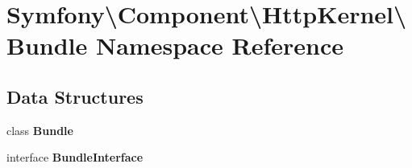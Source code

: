 \section{Symfony\textbackslash{}Component\textbackslash{}Http\+Kernel\textbackslash{}Bundle Namespace Reference}
\label{namespace_symfony_1_1_component_1_1_http_kernel_1_1_bundle}
\subsection*{Data Structures}
\begin{DoxyCompactItemize}
\item 
class {\bf Bundle}
\item 
interface {\bf Bundle\+Interface}
\end{DoxyCompactItemize}
